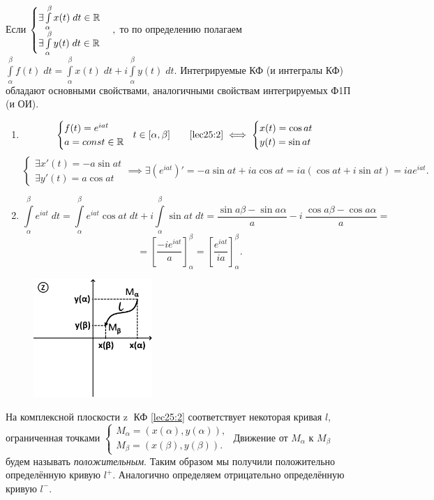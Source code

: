 \documentclass[../../main.tex]{subfiles}
\begin{document}
Если $\begin{cases}
	\exists \int\limits_{\alpha}^{\beta} x(t)\;dt  \in \mathbb{R} \\
	\exists \int\limits_{\alpha}^{\beta} y(t)\;dt  \in \mathbb{R}
\end{cases},$ то по определению полагаем
$\int\limits_{\alpha}^{\beta} f(t)\;dt = 
\int\limits_{\alpha}^{\beta} x(t)\;dt + i\int\limits_{\alpha}^{\beta} 
y(t)\;dt$.
Интегрируемые КФ (и интегралы КФ) обладают
основными свойствами, аналогичными 
свойствам интегрируемых Ф1П (и ОИ).
\begin{exmps}

\;

\begin{enumerate}
\item\[\begin{cases}
	f(t) = e^{iat} \\
	a = const \in \mathbb{R}
\end{cases}\!\! t \in [\alpha, \beta]
\qquad
\eqref{lec25:2} \iff 
\begin{cases}
	x(t) = \cos{at} \\
	y(t) = \sin{at}
\end{cases}  
\]
\[\begin{cases}
	\exists x'(t) = -a\sin{at}  \\
	\exists y'(t) = a\cos{at}
\end{cases}\implies \exists \left(e^{iat} \right)' = -a\sin{at} + ia\cos{at} =
 ia(\cos{at} + i\sin{at}) = iae^{iat}.
\]
\item\[
\int\limits_{\alpha}^{\beta}e^{iat}\;dt =
\int\limits_{\alpha}^{\beta}e^{iat}\cos{at}\;dt +
 i\int\limits_{\alpha}^{\beta}\sin{at}\;dt = 
 \frac{\sin{a\beta} - \sin{a\alpha}}{a} -   
 i\ \frac{\cos{a\beta} - \cos{a\alpha}}{a} = \]\[
= \left[ \frac{-i{e}^{iat}}{a} \right]_{\alpha}^{\beta}= 
\left[ \frac{{e}^{iat}}{ia} \right]_{\alpha}^{\beta}.
\]
\end{enumerate}
\end{exmps}

\begin{figure}
\includegraphics[width=0.4\textwidth]{lec25_1.png}
\end{figure}
На комплексной плоскости \textcircled{z}  КФ \eqref{lec25:2} соответствует
некоторая кривая $l$, ограниченная точками $
\begin{cases}
	M_{\alpha} = (x(\alpha), y(\alpha)), \\
	M_{\beta} = (x(\beta), y(\beta)).
\end{cases} $ Движение от $M_{\alpha}$ к $M_{\beta}$ будем называть 
\emph{положительным}. Таким образом мы получили положительно
определённую кривую $l^+$. Аналогично определяем отрицательно
определённую кривую $l^-$.
\end{document}
